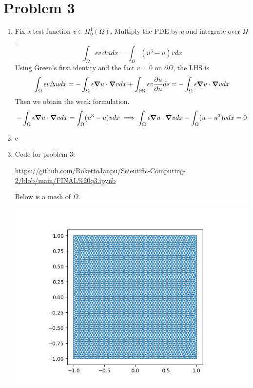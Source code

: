 \documentclass{article}
\newcommand{\ep}{\epsilon}
\newcommand{\imp}{\implies}
\newcommand{\ptl}{\partial}
\newcommand{\Om}{\Omega}
\begin{document}
\section*{Problem 3}

\begin{enumerate}[label=(\alph*)]
	
\item
Fix a test function $v\in H_0^1(\Omega)$. Multiply the PDE by $v$ and integrate over $\Omega$.
$$\int_\Om \ep v\Delta udx = \int_\Om (u^3-u)vdx$$
Using Green's first identity and the fact $v=0$ on $\ptl\Om$, the LHS is
$$\int_\Om \ep v\Delta udx = -\int_\Om \ep\grad u\cdot\grad vdx + \int_{\ptl\Om} \ep v\pdv{u}{n}ds
= -\int_\Om \ep\grad u\cdot\grad vdx$$
Then we obtain the weak formulation.
$$-\int_\Om \ep\grad u\cdot\grad vdx = \int_\Om (u^3-u)vdx
\imp \int_\Om \ep\grad u\cdot\grad vdx - \int_\Om (u-u^3)vdx = 0$$


\item e


\item
Code for problem 3:

\url{https://github.com/RokettoJanpu/Scientific-Computing-2/blob/main/FINAL%20q3.ipynb}

Below is a mesh of $\Omega$.

\begin{center}
	\includegraphics[scale=.5]{FINAL q3 mesh}
\end{center}
\end{enumerate}
	
\end{document}
